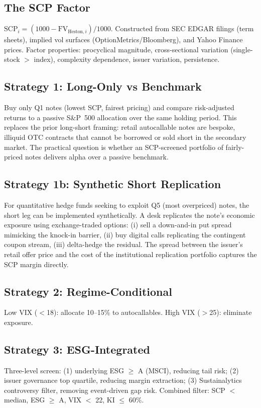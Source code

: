 \documentclass[10pt,a4paper]{article}
\begin{document}
\subsection{The SCP Factor}
$\text{SCP}_i = (1000 - \text{FV}_{\text{Heston},i})/1000$. Constructed from SEC EDGAR filings (term sheets), implied vol surfaces (OptionMetrics/Bloomberg), and Yahoo Finance prices. Factor properties: procyclical magnitude, cross-sectional variation (single-stock $>$ index), complexity dependence, issuer variation, persistence.

\subsection{Strategy 1: Long-Only vs Benchmark} Buy only Q1 notes (lowest SCP, fairest pricing) and compare risk-adjusted returns to a passive S\&P~500 allocation over the same holding period. This replaces the prior long-short framing: retail autocallable notes are bespoke, illiquid OTC contracts that cannot be borrowed or sold short in the secondary market. The practical question is whether an SCP-screened portfolio of fairly-priced notes delivers alpha over a passive benchmark.

\subsection{Strategy 1b: Synthetic Short Replication} For quantitative hedge funds seeking to exploit Q5 (most overpriced) notes, the short leg can be implemented synthetically. A desk replicates the note's economic exposure using exchange-traded options: (i) sell a down-and-in put spread mimicking the knock-in barrier, (ii) buy digital calls replicating the contingent coupon stream, (iii) delta-hedge the residual. The spread between the issuer's retail offer price and the cost of the institutional replication portfolio captures the SCP margin directly.

\subsection{Strategy 2: Regime-Conditional} Low VIX ($<$18): allocate 10--15\% to autocallables. High VIX ($>$25): eliminate exposure.

\subsection{Strategy 3: ESG-Integrated} Three-level screen: (1) underlying ESG $\geq$ A (MSCI), reducing tail risk; (2) issuer governance top quartile, reducing margin extraction; (3) Sustainalytics controversy filter, removing event-driven gap risk. Combined filter: SCP $<$ median, ESG $\geq$ A, VIX $<$ 22, KI $\leq$ 60\%.
\end{document}
